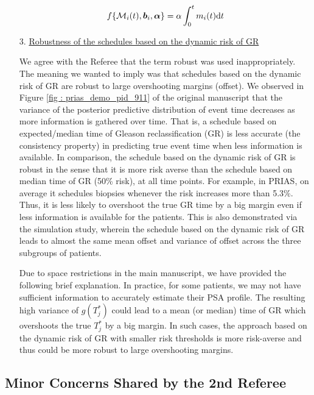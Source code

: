 \begin{enumerate}
    \begin{equation}
    f\{\mathcal{M}_i(t), \boldsymbol{b}_i, \boldsymbol{\alpha}\} = \alpha \int_0^t m_i(t) \mathrm{d}{t}
    \end{equation}

    \item[3.] \underline{Robustness of the schedules based on the dynamic risk of GR}
    
    We agree with the Referee that the term robust was used inappropriately. The meaning we wanted to imply was that schedules based on the dynamic risk of GR are robust to large overshooting margins (offset). We observed in Figure \ref{fig : prias_demo_pid_911} of the original manuscript that the variance of the posterior predictive distribution of event time decreases as more information is gathered over time. That is, a schedule based on expected/median time of Gleason reclassification (GR) is less accurate (the consistency property) in predicting true event time when less information is available. In comparison, the schedule based on the dynamic risk of GR is robust in the sense that it is more risk averse than the schedule based on median time of GR (50\% risk), at all time points. For example, in PRIAS, on average it schedules biopsies whenever the risk increases more than 5.3\%. Thus, it is less likely to overshoot the true GR time by a big margin even if less information is available for the patients. This is also demonstrated via the simulation study, wherein the schedule based on the dynamic risk of GR leads to almost the same mean offset and variance of offset across the three subgroups of patients. 

    Due to space restrictions in the main manuscript, we have provided the following brief explanation. In practice, for some patients, we may not have sufficient information to accurately estimate their PSA profile. The resulting high variance of $g(T^*_j)$ could lead to a mean (or median) time of GR which overshoots the true $T_j^*$ by a big margin. In such cases, the approach based on the dynamic risk of GR with smaller risk thresholds is more risk-averse and thus could be more robust to large overshooting margins. 

\end{enumerate}

\subsection*{Minor Concerns Shared by the 2nd Referee}

